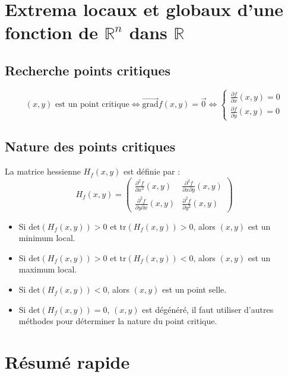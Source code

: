\documentclass[a4paper,12pt]{article}
\begin{document}
    \section{Extrema locaux et globaux d'une fonction de $\mathbb{R}^n$ dans $\mathbb{R}$}
        \subsection{Recherche points critiques}
            $$ (x, y) \text{ est un point critique} \Longleftrightarrow \overrightarrow{\text{grad}}f(x, y) = \vec{0} \Longleftrightarrow \begin{cases}
                \frac{\partial f}{\partial x}(x, y) = 0 \\
                \frac{\partial f}{\partial y}(x, y) = 0
            \end{cases}
            $$
        
        \subsection{Nature des points critiques}
            La matrice hessienne $H_f(x, y)$ est définie par :
            $$ H_f(x, y) = \begin{pmatrix}
                \frac{\partial^2 f}{\partial x^2}(x, y) & \frac{\partial^2 f}{\partial x \partial y}(x, y) \\
                \frac{\partial^2 f}{\partial y \partial x}(x, y) & \frac{\partial^2 f}{\partial y^2}(x, y)
            \end{pmatrix} $$

            \begin{itemize}
                \item Si $\text{det}(H_f(x, y)) > 0$ et $\text{tr}(H_f(x, y)) > 0$, alors $(x, y)$ est un minimum local.
                \item Si $\text{det}(H_f(x, y)) > 0$ et $\text{tr}(H_f(x, y)) < 0$, alors $(x, y)$ est un maximum local.
                \item Si $\text{det}(H_f(x, y)) < 0$, alors $(x, y)$ est un point selle.
                \item Si $\text{det}(H_f(x, y)) = 0$, $(x, y)$ est dégénéré, il faut utiliser d'autres méthodes pour déterminer la nature du point critique.
            \end{itemize}
            


    \section*{Résumé rapide}
\end{document}

